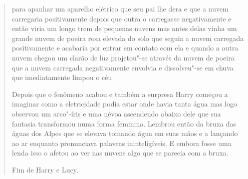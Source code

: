 \begin{quote}
para apanhar um aparelho elétrico que seu pai lhe dera e que a nuvem
carregaria positivamente depois que outra o carregasse negativamente e
então viria um longo trem de pequenas nuvens mas antes delas vinha um
grande nuvem de poeira rosa elevada do solo que seguia a nuvem carregada
positivamente e acabaria por entrar em contato com ela e quando a outra
nuvem chegou um clarão de luz projetou"-se através da nuvem de poeira que
a nuvem carregada negativamente envolvia e dissolveu"-se em chuva que
imediatamente limpou o céu

Depois que o fenômeno acabou e também a surpresa Harry começou a
imaginar como a eletricidade podia estar onde havia tanta água mas logo
observou um arco"-íris e uma névoa ascendendo abaixo dele que sua
fantasia transformou numa forma feminina. Lembrou então da bruxa das
águas dos Alpes que se elevava tomando água em suas mãos e a lançando ao
ar enquanto pronunciava palavras ininteligíveis. E embora fosse uma
lenda isso o afetou ao ver nas nuvens algo que se parecia com a bruxa.

Fim de Harry e Lucy.
\end{quote}

